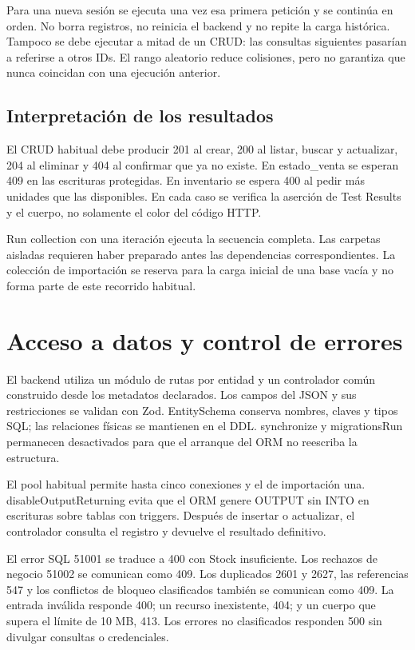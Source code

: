 Para una nueva sesión se ejecuta una vez esa primera petición y se continúa en orden. No borra registros, no reinicia el backend y no repite la carga histórica. Tampoco se debe ejecutar a mitad de un CRUD: las consultas siguientes pasarían a referirse a otros IDs. El rango aleatorio reduce colisiones, pero no garantiza que nunca coincidan con una ejecución anterior.

\subsection{Interpretación de los resultados}
El CRUD habitual debe producir 201 al crear, 200 al listar, buscar y actualizar, 204 al eliminar y 404 al confirmar que ya no existe. En estado\_venta se esperan 409 en las escrituras protegidas. En inventario se espera 400 al pedir más unidades que las disponibles. En cada caso se verifica la aserción de Test Results y el cuerpo, no solamente el color del código HTTP.

Run collection con una iteración ejecuta la secuencia completa. Las carpetas aisladas requieren haber preparado antes las dependencias correspondientes. La colección de importación se reserva para la carga inicial de una base vacía y no forma parte de este recorrido habitual.

\section{Acceso a datos y control de errores}
El backend utiliza un módulo de rutas por entidad y un controlador común construido desde los metadatos declarados. Los campos del JSON y sus restricciones se validan con Zod. EntitySchema conserva nombres, claves y tipos SQL; las relaciones físicas se mantienen en el DDL. synchronize y migrationsRun permanecen desactivados para que el arranque del ORM no reescriba la estructura.

El pool habitual permite hasta cinco conexiones y el de importación una. disableOutputReturning evita que el ORM genere OUTPUT sin INTO en escrituras sobre tablas con triggers. Después de insertar o actualizar, el controlador consulta el registro y devuelve el resultado definitivo.

El error SQL 51001 se traduce a 400 con Stock insuficiente. Los rechazos de negocio 51002 se comunican como 409. Los duplicados 2601 y 2627, las referencias 547 y los conflictos de bloqueo clasificados también se comunican como 409. La entrada inválida responde 400; un recurso inexistente, 404; y un cuerpo que supera el límite de 10 MB, 413. Los errores no clasificados responden 500 sin divulgar consultas o credenciales.

